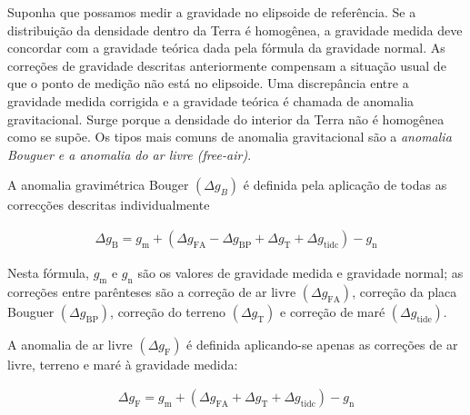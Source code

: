 \documentclass[]{book}
\theoremstyle{definition}
\theoremstyle{definition}
\theoremstyle{definition}
\theoremstyle{remark}
\begin{document}
Suponha que possamos medir a gravidade no elipsoide de referência. Se a distribuição da densidade dentro da Terra é homogênea, a gravidade medida deve concordar com a gravidade teórica dada pela fórmula da gravidade normal. As correções de gravidade descritas anteriormente compensam a situação usual de que o ponto de medição não está no elipsoide. Uma discrepância entre a gravidade medida corrigida e a gravidade teórica é chamada de anomalia gravitacional. Surge porque a densidade do interior da Terra não é homogênea como se supõe. Os tipos mais comuns de anomalia gravitacional são a \emph{anomalia Bouguer e a anomalia do ar livre (free-air)}.

A anomalia gravimétrica Bouger \(\left(\Delta g_{B}\right)\) é definida pela aplicação de todas as correcções descritas individualmente

\begin{align}
\Delta g_{\mathrm{B}}=g_{\mathrm{m}}+\left(\Delta g_{\mathrm{FA}}-\Delta g_{\mathrm{BP}}+\Delta g_{\mathrm{T}}+\Delta g_{\mathrm{tidc}}\right)-g_{\mathrm{n}}
\label{eq:0248}
\end{align}

Nesta fórmula, \(g_{\mathrm{m}}\) e \(g_{\mathrm{n}}\) são os valores de gravidade medida e gravidade normal; as correções entre parênteses são a correção de ar livre \(\left(\Delta g_{\mathrm{FA}}\right)\), correção da placa Bouguer \(\left(\Delta g_{\mathrm{BP}}\right)\), correção do terreno \(\left(\Delta g_{\mathrm{T}}\right)\) e correção de maré \(\left(\Delta g_{\mathrm{tide}}\right)\).

A anomalia de ar livre \(\left(\Delta g_{\mathrm{F}}\right)\) é definida aplicando-se apenas as correções de ar livre, terreno e maré à gravidade medida:

\begin{align}
\Delta g_{\mathrm{F}}=g_{\mathrm{m}}+\left(\Delta g_{\mathrm{FA}}+\Delta g_{\mathrm{T}}+\Delta g_{\mathrm{tidc}}\right)-g_{\mathrm{n}}
\label{eq:0249}
\end{align}
\end{document}
